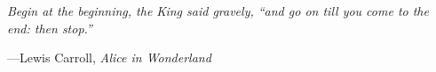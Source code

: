 \newpage
\setlength{}
\setlength\epigraphrule{0pt}

\thispagestyle{empty}

\vspace*{\fill}
\epigraph{\itshape Begin at the beginning, the King said gravely, ``and go on till you come to the end: then stop.''}{---Lewis Carroll, \textit{Alice in Wonderland}}

\newpage